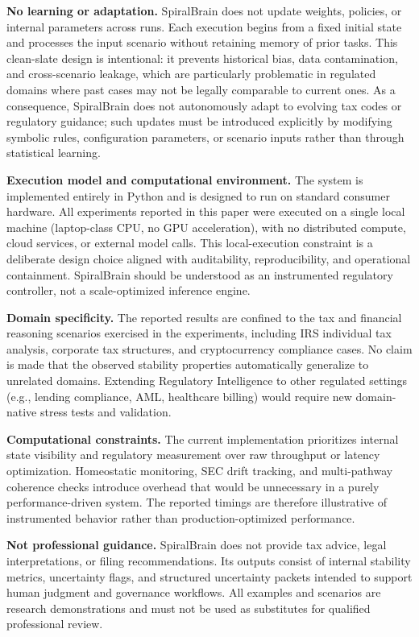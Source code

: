 \documentclass[12pt,a4paper]{article}
\begin{document}
\textbf{No learning or adaptation.} SpiralBrain does not update weights, policies, or internal parameters across runs. Each execution begins from a fixed initial state and processes the input scenario without retaining memory of prior tasks. This clean-slate design is intentional: it prevents historical bias, data contamination, and cross-scenario leakage, which are particularly problematic in regulated domains where past cases may not be legally comparable to current ones. As a consequence, SpiralBrain does not autonomously adapt to evolving tax codes or regulatory guidance; such updates must be introduced explicitly by modifying symbolic rules, configuration parameters, or scenario inputs rather than through statistical learning.

\textbf{Execution model and computational environment.} The system is implemented entirely in Python and is designed to run on standard consumer hardware. All experiments reported in this paper were executed on a single local machine (laptop-class CPU, no GPU acceleration), with no distributed compute, cloud services, or external model calls. This local-execution constraint is a deliberate design choice aligned with auditability, reproducibility, and operational containment. SpiralBrain should be understood as an instrumented regulatory controller, not a scale-optimized inference engine.

\textbf{Domain specificity.} The reported results are confined to the tax and financial reasoning scenarios exercised in the experiments, including IRS individual tax analysis, corporate tax structures, and cryptocurrency compliance cases. No claim is made that the observed stability properties automatically generalize to unrelated domains. Extending Regulatory Intelligence to other regulated settings (e.g., lending compliance, AML, healthcare billing) would require new domain-native stress tests and validation.

\textbf{Computational constraints.} The current implementation prioritizes internal state visibility and regulatory measurement over raw throughput or latency optimization. Homeostatic monitoring, SEC drift tracking, and multi-pathway coherence checks introduce overhead that would be unnecessary in a purely performance-driven system. The reported timings are therefore illustrative of instrumented behavior rather than production-optimized performance.

\textbf{Not professional guidance.} SpiralBrain does not provide tax advice, legal interpretations, or filing recommendations. Its outputs consist of internal stability metrics, uncertainty flags, and structured uncertainty packets intended to support human judgment and governance workflows. All examples and scenarios are research demonstrations and must not be used as substitutes for qualified professional review.
\end{document}

